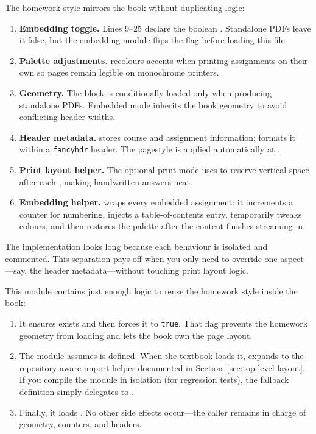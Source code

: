 The homework style mirrors the book without duplicating logic:
\begin{enumerate}[leftmargin=2em]
  \item \textbf{Embedding toggle.} Lines 9--25 declare the boolean
        \InlineMacro{\ifMathHomeworkEmbedded}. Standalone PDFs leave it false,
        but the embedding module flips the flag before loading this file.
  \item \textbf{Palette adjustments.} \InlineMacro{\HomeworkApplyStandalonePalette}
        recolours accents when printing assignments on their own so pages remain
        legible on monochrome printers.
  \item \textbf{Geometry.} The \InlineMacro{\usepackage{geometry}} block is
        conditionally loaded only when producing standalone PDFs. Embedded mode
        inherits the book geometry to avoid conflicting header widths.
  \item \textbf{Header metadata.} \InlineMacro{\HomeworkSetup} stores course and
        assignment information; \InlineMacro{\HomeworkHeader} formats it within a
        \texttt{fancyhdr} header. The pagestyle is applied automatically at
        \InlineMacro{\AtBeginDocument}.
  \item \textbf{Print layout helper.} The optional print mode uses
        \InlineMacro{\HomeworkEnablePrintLayout} to reserve vertical space after
        each \InlineMacro{\solutionbox}, making handwritten answers neat.
  \item \textbf{Embedding helper.} \InlineMacro{\HomeworkIncludeInNotes} wraps
        every embedded assignment: it increments a counter for numbering,
        injects a table-of-contents entry, temporarily tweaks colours, and then
        restores the palette after the content finishes streaming in.
\end{enumerate}
The implementation looks long because each behaviour is isolated and commented.
This separation pays off when you only need to override one aspect—say, the
header metadata—without touching print layout logic.

\label{sec:module-homework}

This module contains just enough logic to reuse the homework style inside the
book:
\begin{enumerate}[leftmargin=2em]
  \item It ensures \InlineMacro{\ifMathHomeworkEmbedded} exists and then forces
        it to \texttt{true}. That flag prevents the homework geometry from
        loading and lets the book own the page layout.
  \item The module assumes \InlineMacro{\TexInput} is defined. When the textbook
        loads it, \InlineMacro{\TexInput} expands to the repository-aware import
        helper documented in Section~\ref{sec:top-level-layout}. If you compile
        the module in isolation (for regression tests), the fallback definition
        simply delegates to \InlineMacro{}.
  \item Finally, it loads . No other side effects
        occur—the caller remains in charge of geometry, counters, and headers.
\end{enumerate}

